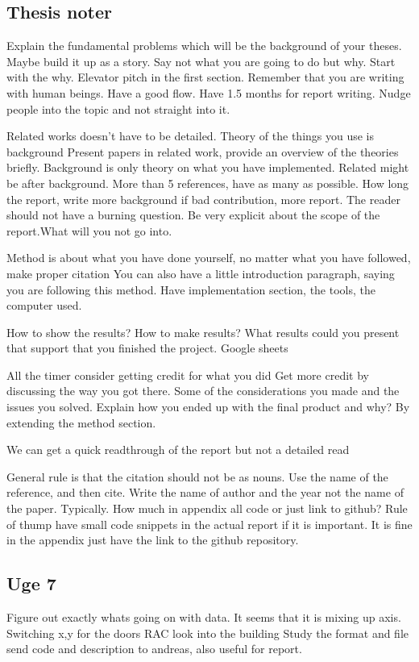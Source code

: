 \subsection{Thesis noter}
Explain the fundamental problems which will be the background of your theses.
Maybe build it up as a story.
Say not what you are going to do but why.
Start with the why. Elevator pitch in the first section.
Remember that you are writing with human beings. Have a good flow. Have 1.5 months for report writing.
Nudge people into the topic and not straight into it.

Related works doesn't have to be detailed.
Theory of the things you use is background
Present papers in related work, provide an overview of the theories briefly.
Background is only theory on what you have implemented.
Related might be after background.
More than 5 references, have as many as possible.
How long the report, write more background if bad contribution, more report.
The reader should not have a burning question.
Be very explicit about the scope of the report.What will you not go into.

Method is about what you have done yourself, no matter what you have followed, make proper citation 
You can also have a little introduction paragraph, saying you are following this method.
Have implementation section, the tools, the computer used.

How to show the results?
How to make results?
What results could you present that support that you finished the project.
Google sheets

All the timer consider getting credit for what you did
Get more credit by discussing the way you got there. Some of the considerations you made and the issues you solved.
Explain how you ended up with the final product and why?
By extending the method section.

We can get a quick readthrough of the report but not a detailed read

General rule is that the citation should not be as nouns.
Use the name of the reference, and then cite.
Write the name of author and the year not the name of the paper. Typically.
How much in appendix all code or just link to github?
Rule of thump have small code snippets in the actual report if it is important. It is fine in the appendix just have the link to the github repository.


\subsection{Uge 7}
Figure out exactly whats going on with data.
It seems that it is mixing up axis.
Switching x,y for the doors
RAC look into the building 
Study the format and file
send code and description to andreas, also useful for report.

